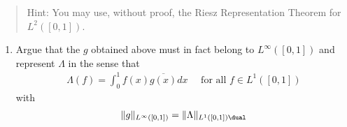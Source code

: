 \begin{quote}
Hint: You may use, without proof, the Riesz Representation Theorem for
\(L^2([0, 1])\).
\end{quote}

\begin{enumerate}
\def\labelenumi{\roman{enumi}.}
\setcounter{enumi}{1}
\tightlist
\item
  Argue that the \(g\) obtained above must in fact belong to
  \(L^∞([0, 1])\) and represent \(Λ\) in the sense that
  \begin{align*}
    \Lambda(f)=\int_{0}^{1} f(x) \overline{g(x)} d x \quad \text { for all } f \in L^{1}([0,1])
    \end{align*} with
  \begin{align*}
    \|g\|_{L^{\infty}([0,1])} = \|\Lambda\|_{L^{1}([0,1])\dual}
    \end{align*}
\end{enumerate}

